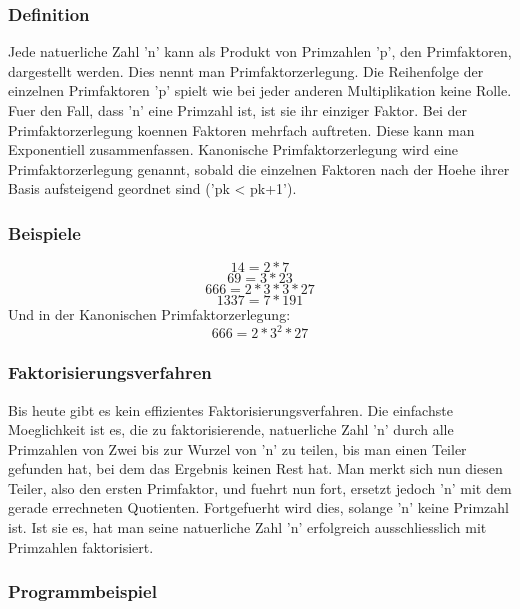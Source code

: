 \subsubsection{Definition}
Jede natuerliche Zahl 'n' kann als Produkt von Primzahlen 'p', den Primfaktoren, dargestellt werden. Dies nennt man Primfaktorzerlegung. Die Reihenfolge der einzelnen Primfaktoren 'p' spielt wie bei jeder anderen Multiplikation keine Rolle. Fuer den Fall, dass 'n' eine Primzahl ist, ist sie ihr einziger Faktor. Bei der Primfaktorzerlegung koennen Faktoren mehrfach auftreten. Diese kann man Exponentiell zusammenfassen. Kanonische Primfaktorzerlegung wird eine Primfaktorzerlegung genannt, sobald die einzelnen Faktoren nach der Hoehe ihrer Basis aufsteigend geordnet sind ('pk < pk+1').
\subsubsection{Beispiele}
\begin{equation}
14 = 2 * 7
\end{equation}
\begin{equation}
69 = 3 * 23
\end{equation}
\begin{equation}
666 = 2 * 3 * 3 * 27
\end{equation}
\begin{equation}
1337 = 7 * 191
\end{equation}
Und in der Kanonischen Primfaktorzerlegung:
\begin{equation}
666 = 2 * 3^2 * 27
\end{equation}
\subsubsection{Faktorisierungsverfahren}
Bis heute gibt es kein effizientes Faktorisierungsverfahren. Die einfachste Moeglichkeit ist es, die zu faktorisierende, natuerliche Zahl 'n' durch alle Primzahlen von Zwei bis zur Wurzel von 'n' zu teilen, bis man einen Teiler gefunden hat, bei dem das Ergebnis keinen Rest hat. Man merkt sich nun diesen Teiler, also den ersten Primfaktor, und fuehrt nun fort, ersetzt jedoch 'n' mit dem gerade errechneten Quotienten. Fortgefuerht wird dies, solange 'n' keine Primzahl ist. Ist sie es, hat man seine natuerliche Zahl 'n' erfolgreich ausschliesslich mit Primzahlen faktorisiert.
\subsubsection{Programmbeispiel}
